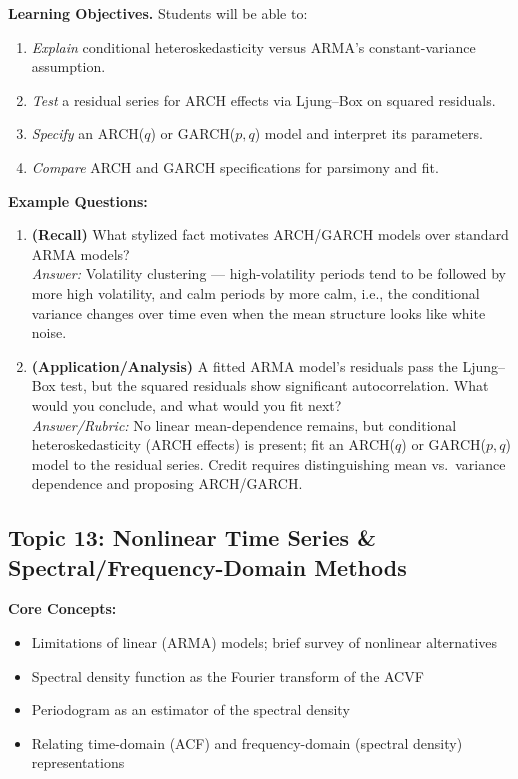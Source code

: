\documentclass[11pt]{article}
\begin{document}
\textbf{Learning Objectives.} Students will be able to:
\begin{enumerate}
\item \emph{Explain} conditional heteroskedasticity versus ARMA's constant-variance assumption.
\item \emph{Test} a residual series for ARCH effects via Ljung--Box on squared residuals.
\item \emph{Specify} an ARCH($q$) or GARCH($p,q$) model and interpret its parameters.
\item \emph{Compare} ARCH and GARCH specifications for parsimony and fit.
\end{enumerate}

\textbf{Example Questions:}
\begin{enumerate}
\item \textbf{(Recall)} What stylized fact motivates ARCH/GARCH models over standard ARMA models? \\
\emph{Answer:} Volatility clustering --- high-volatility periods tend to be followed by more high volatility, and calm periods by more calm, i.e., the conditional variance changes over time even when the mean structure looks like white noise.
\item \textbf{(Application/Analysis)} A fitted ARMA model's residuals pass the Ljung--Box test, but the squared residuals show significant autocorrelation. What would you conclude, and what would you fit next? \\
\emph{Answer/Rubric:} No linear mean-dependence remains, but conditional heteroskedasticity (ARCH effects) is present; fit an ARCH($q$) or GARCH($p,q$) model to the residual series. Credit requires distinguishing mean vs.\ variance dependence and proposing ARCH/GARCH.
\end{enumerate}

\subsection{Topic 13: Nonlinear Time Series \& Spectral/Frequency-Domain Methods}

\textbf{Core Concepts:}
\begin{itemize}
\item Limitations of linear (ARMA) models; brief survey of nonlinear alternatives
\item Spectral density function as the Fourier transform of the ACVF
\item Periodogram as an estimator of the spectral density
\item Relating time-domain (ACF) and frequency-domain (spectral density) representations
\end{itemize}
\end{document}
